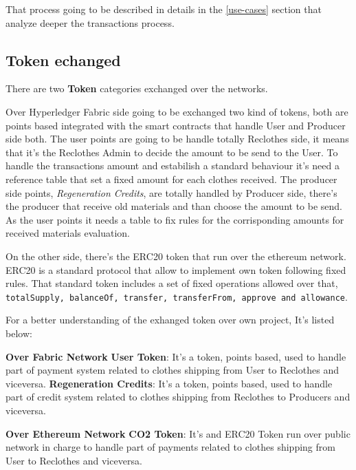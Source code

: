 That process going to be described in details in the \ref{use-cases} section that analyze 
deeper the transactions process. 

\subsection{Token echanged}

There are two \textbf{Token} categories exchanged over the networks. 
\bigskip

Over Hyperledger Fabric side going to be exchanged two kind of tokens, both are points based integrated with the 
smart contracts that handle User and Producer side both. The user points are going to be handle 
totally Reclothes side, it means that it's the Reclothes Admin to decide the amount to be send to the User. 
To handle the transactions amount and estabilish a standard behaviour it's need  
a reference table that set a fixed amount for each clothes received. The producer side 
points, \textit{Regeneration Credits}, are totally handled by Producer side, there's the producer that receive 
old materials and than choose the amount to be send. As the user points it needs a table to fix rules for 
the corrisponding amounts for received materials evaluation. 
\bigskip

On the other side, there's the ERC20 token that run over the ethereum network. ERC20 is a standard protocol
that allow to implement own token following fixed rules. That standard token includes a set of fixed
operations allowed over that, \texttt{totalSupply, balanceOf, transfer, transferFrom, 
approve and allowance}. 

\bigskip
For a better understanding of the exhanged token over own project, It's listed below:

\begin{outline}[enumerate]
	\1 \textbf{Over Fabric Network}
    \2 \textbf{User Token}: It's a token, points based, used to handle part of payment system related to clothes
    shipping from User to Reclothes and viceversa.
    \2 \textbf{Regeneration Credits}: It's a token, points based, used to handle part of credit system related to clothes
    shipping from Reclothes to Producers and viceversa.

    \1 \textbf{Over Ethereum Network}
    \2 \textbf{CO2 Token}: It's and ERC20 Token run over public network in charge to handle part of payments
    related to clothes shipping from User to Reclothes and viceversa.
\end{outline}


